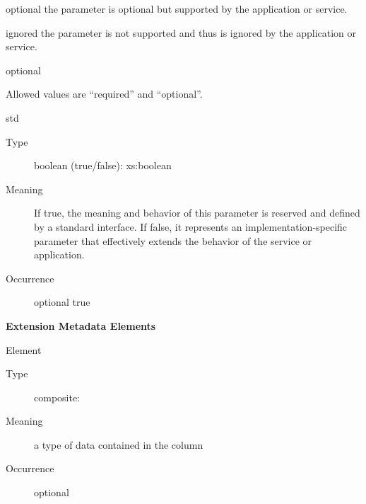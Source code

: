 \documentclass[11pt,a4paper]{ivoa}
\begin{document}
\begin{generated}
\begin{bigdescription}
\begin{description}
\begin{longtermsdescription}
\item[optional]
                  the parameter is optional but supported by the application or
                  service.
               
\item[ignored]
                  the parameter is not supported and thus is ignored by the 
                  application or service.
               
\end{longtermsdescription}
optional
\item[Comment] 
                     Allowed values are “required” and “optional”.
                  
\end{description}
\item[std]
\begin{description}
\item[Type] boolean (true/false): xs:boolean
\item[Meaning] 
                     If true, the meaning and behavior of this parameter is
                     reserved and defined by a standard interface.  If
                     false, it represents an implementation-specific
                     parameter that effectively extends the behavior of the 
                     service or application.  
                  
\item[Occurrence] optional
true
\end{description}


\end{bigdescription}\endgroup



\vspace{0.5ex}\noindent\textbf{ Extension Metadata Elements}

\begingroup\small\begin{bigdescription}\item[Element \xmlel{dataType}]
\begin{description}
\item[Type] composite: 
\item[Meaning] 
                        a type of data contained in the column
                     
\item[Occurrence] optional

\end{description}


\end{bigdescription}\endgroup

\endgroup
\end{generated}
\end{document}
